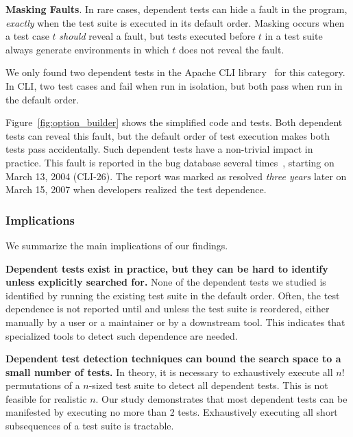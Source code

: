

\vspace{1mm}

\noindent \textbf{Masking Faults}. In rare cases,
dependent tests can hide a fault in the
program, \emph{exactly} when the test suite is executed in its default
order. Masking occurs when a test case $t$ \emph{should}
reveal a fault, but tests executed before $t$ in a test suite always
generate environments in which $t$ does not reveal the fault.



We only found two dependent tests in
the Apache CLI library~\cite{cli} for this category.
In CLI, two test cases 
 and 
fail when run in isolation,
but both pass when run in the default order.

Figure~\ref{fig:option_builder} shows the simplified code and
tests. Both dependent tests can reveal this fault,  but
the default order of test execution makes both tests pass
accidentally. Such dependent tests
have a non-trivial impact in practice.
This fault is reported in the bug
database several times~\cite{clibug}, starting on March 13, 2004 (CLI-26). The report was marked as resolved
\emph{three years} later on March 15, 2007 when developers
realized the test dependence.


\subsubsection{Implications}

We summarize the main implications of our findings.

\noindent \textbf{{Dependent tests exist in practice, but
they can be hard to identify unless explicitly searched for.}}
None of the dependent tests we studied is identified by
running the existing test suite in the default order. Often,
the test dependence is not reported until and unless the
test suite is reordered, either manually by a user or
a maintainer or by a downstream tool. This indicates that
specialized tools to detect such dependence are needed.

\vspace{1mm}
\noindent \textbf{Dependent test detection techniques
can bound the search space to a small number of tests.}
In theory, it is necessary
to exhaustively execute all $n!$ permutations of a $n$-sized
test suite to detect all dependent tests. This is
not feasible for realistic $n$.  Our study demonstrates that
most dependent tests can be manifested by executing
no more than 2 tests.  Exhaustively executing all 
short subsequences of a test suite is tractable.

